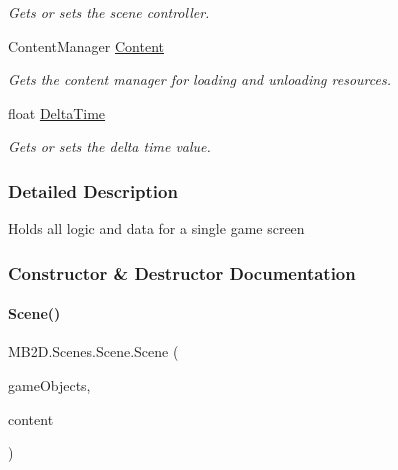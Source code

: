 \begin{DoxyCompactItemize}
\begin{DoxyCompactList}\small\item\em Gets or sets the scene controller. \end{DoxyCompactList}\item 
Content\+Manager \hyperlink{class_m_b2_d_1_1_scenes_1_1_scene_a8d5434f75a273135d8bae9ce36cc69ee}{Content}
\begin{DoxyCompactList}\small\item\em Gets the content manager for loading and unloading resources. \end{DoxyCompactList}\item 
float \hyperlink{class_m_b2_d_1_1_scenes_1_1_scene_a43b51703cf436d8033fac12386b300ba}{Delta\+Time}
\begin{DoxyCompactList}\small\item\em Gets or sets the delta time value. \end{DoxyCompactList}\end{DoxyCompactItemize}


\subsubsection{Detailed Description}
Holds all logic and data for a single game screen 



\subsubsection{Constructor \& Destructor Documentation}
\hypertarget{class_m_b2_d_1_1_scenes_1_1_scene_ac9cb0c45a98614e7e4c1307ebb6ef85e}{}\label{class_m_b2_d_1_1_scenes_1_1_scene_ac9cb0c45a98614e7e4c1307ebb6ef85e} 
\paragraph{\texorpdfstring{Scene()}{Scene()}}
{\footnotesize\ttfamily M\+B2\+D.\+Scenes.\+Scene.\+Scene (\begin{DoxyParamCaption}\item[{\hyperlink{class_m_b2_d_1_1_entity_component_1_1_entity_map}{Entity\+Map}}]{game\+Objects,  }\item[{Content\+Manager}]{content }\end{DoxyParamCaption})\hspace{0.3cm}{\ttfamily [inline]}}



